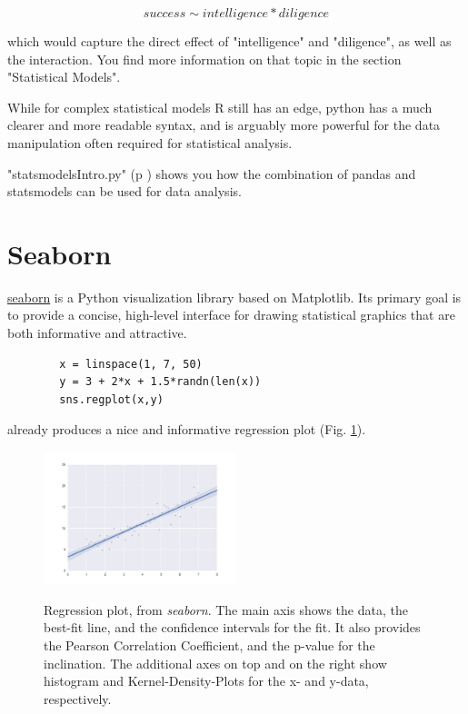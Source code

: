 \begin{equation*}
    success \sim intelligence * diligence
\end{equation*}

 which would capture the direct effect of "intelligence" and "diligence", as well as the interaction. You find more information on that topic in the section "Statistical Models".

While for complex statistical models R still has an edge, python has a much clearer and more readable syntax, and is arguably more powerful for the data manipulation often required for statistical analysis.

\PyImg "statsmodelsIntro.py" (p \pageref{py:statsmodelsIntro}) shows you how the combination of pandas and statsmodels can be used for data analysis.

\section{Seaborn}

\href{http://statsmodels.sourceforge.net/.}{seaborn} is a Python visualization library based on Matplotlib. Its primary goal is to provide a concise, high-level interface for drawing statistical graphics that are both informative and attractive.

\begin{lstlisting}
        x = linspace(1, 7, 50)
        y = 3 + 2*x + 1.5*randn(len(x))
        sns.regplot(x,y)
\end{lstlisting}

already produces a nice and informative regression plot (Fig. \ref{fig:seaborn}).

\begin{figure}[ht]
  \centering
  \includegraphics[width=0.5\textwidth]{../Images/regplot.png}\\
  \caption{Regression plot, from \emph{seaborn}. The main axis shows the data, the best-fit line, and the confidence intervals for the fit. It also provides the Pearson Correlation Coefficient, and the p-value for the inclination. The additional axes on top and on the right show histogram and Kernel-Density-Plots for the x- and y-data, respectively.}
  \label{fig:seaborn}
\end{figure}

